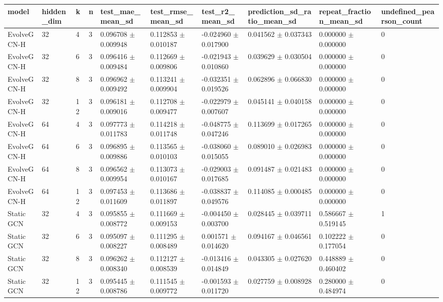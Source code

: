 \begin{tabular}{llllllllll}
\hline
model & hidden\_dim & k & n & test\_mae\_mean\_sd & test\_rmse\_mean\_sd & test\_r2\_mean\_sd & prediction\_sd\_ratio\_mean\_sd & repeat\_fraction\_mean\_sd & undefined\_pearson\_count \\
\hline
EvolveGCN-H & 32 & 4 & 3 & 0.096708 $\pm$ 0.009948 & 0.112853 $\pm$ 0.010187 & -0.024960 $\pm$ 0.017900 & 0.041562 $\pm$ 0.037343 & 0.000000 $\pm$ 0.000000 & 0 \\
EvolveGCN-H & 32 & 6 & 3 & 0.096416 $\pm$ 0.009484 & 0.112669 $\pm$ 0.009806 & -0.021943 $\pm$ 0.010860 & 0.039629 $\pm$ 0.030504 & 0.000000 $\pm$ 0.000000 & 0 \\
EvolveGCN-H & 32 & 8 & 3 & 0.096962 $\pm$ 0.009492 & 0.113241 $\pm$ 0.009904 & -0.032351 $\pm$ 0.019526 & 0.062896 $\pm$ 0.066830 & 0.000000 $\pm$ 0.000000 & 0 \\
EvolveGCN-H & 32 & 12 & 3 & 0.096181 $\pm$ 0.009016 & 0.112708 $\pm$ 0.009477 & -0.022979 $\pm$ 0.007607 & 0.045141 $\pm$ 0.040158 & 0.000000 $\pm$ 0.000000 & 0 \\
EvolveGCN-H & 64 & 4 & 3 & 0.097773 $\pm$ 0.011783 & 0.114218 $\pm$ 0.011748 & -0.048775 $\pm$ 0.047246 & 0.113699 $\pm$ 0.017265 & 0.000000 $\pm$ 0.000000 & 0 \\
EvolveGCN-H & 64 & 6 & 3 & 0.096895 $\pm$ 0.009886 & 0.113565 $\pm$ 0.010103 & -0.038060 $\pm$ 0.015055 & 0.089010 $\pm$ 0.026983 & 0.000000 $\pm$ 0.000000 & 0 \\
EvolveGCN-H & 64 & 8 & 3 & 0.096562 $\pm$ 0.009954 & 0.113073 $\pm$ 0.010167 & -0.029003 $\pm$ 0.017685 & 0.091487 $\pm$ 0.021483 & 0.000000 $\pm$ 0.000000 & 0 \\
EvolveGCN-H & 64 & 12 & 3 & 0.097453 $\pm$ 0.011609 & 0.113686 $\pm$ 0.011897 & -0.038837 $\pm$ 0.049576 & 0.114085 $\pm$ 0.000485 & 0.000000 $\pm$ 0.000000 & 0 \\
Static GCN & 32 & 4 & 3 & 0.095855 $\pm$ 0.008772 & 0.111669 $\pm$ 0.009153 & -0.004450 $\pm$ 0.003700 & 0.028445 $\pm$ 0.039711 & 0.586667 $\pm$ 0.519145 & 1 \\
Static GCN & 32 & 6 & 3 & 0.095097 $\pm$ 0.008227 & 0.111295 $\pm$ 0.008489 & 0.001571 $\pm$ 0.014620 & 0.094167 $\pm$ 0.046561 & 0.102222 $\pm$ 0.177054 & 0 \\
Static GCN & 32 & 8 & 3 & 0.096262 $\pm$ 0.008340 & 0.112127 $\pm$ 0.008539 & -0.013416 $\pm$ 0.014849 & 0.043305 $\pm$ 0.027620 & 0.448889 $\pm$ 0.460402 & 0 \\
Static GCN & 32 & 12 & 3 & 0.095445 $\pm$ 0.008786 & 0.111545 $\pm$ 0.009772 & -0.001593 $\pm$ 0.011720 & 0.027759 $\pm$ 0.008928 & 0.280000 $\pm$ 0.484974 & 0 \\

\end{tabular}
